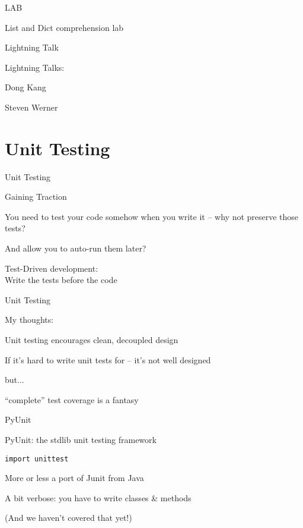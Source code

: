 \documentclass{beamer}
\begin{document}
\begin{frame}{LAB}

{\Large List and Dict comprehension lab}



\end{frame}


\begin{frame}{Lightning Talk}

{\LARGE Lightning Talks:}

{\large 
\vfill
Dong Kang

\vfill
Steven Werner
}
\vfill
\end{frame}


\section{Unit Testing}

\begin{frame}[fragile]{Unit Testing}

{\LARGE Gaining Traction}

\vfill
{\Large You need to test your code somehow when you write it --
        why not preserve those tests?}

\vfill
{\Large And allow you to auto-run them later?}

\vfill
{\LARGE Test-Driven development:}\\[0.1in]
{\Large \hspace{0.3in} Write the tests before the code}

\end{frame} 

\begin{frame}[fragile]{Unit Testing}

{\LARGE My thoughts:}

\vfill
{\Large Unit testing encourages clean, decoupled design}

\vfill
{\Large If it's hard to write unit tests for -- it's not well designed}

\vfill
{\Large but...}

\vfill
{\Large ``complete'' test coverage is a fantasy}

\end{frame} 


\begin{frame}[fragile]{PyUnit}

{\LARGE PyUnit: the stdlib unit testing framework}

\vfill
{\Large \verb|import unittest|}

\vfill
{\Large More or less a port of Junit from Java}

\vfill
{\Large A bit verbose: you have to write classes \& methods}

\vfill
{\large (And we haven't covered that yet!)}

\end{frame} 
\end{document}
